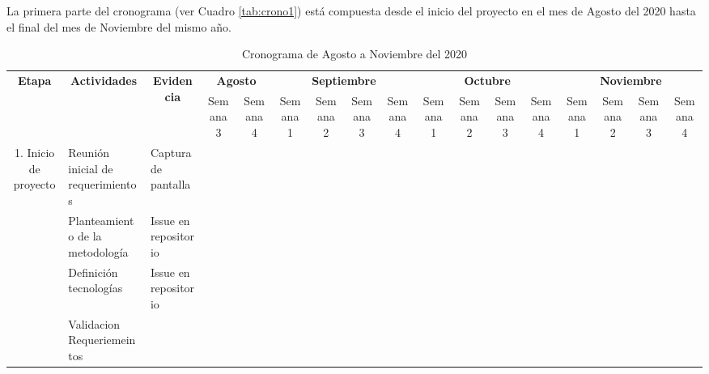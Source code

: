 La primera parte del cronograma (ver Cuadro \ref{tab:crono1}) está compuesta desde el inicio del proyecto en el mes de Agosto del 2020 hasta el final del mes de Noviembre del mismo año.

\begin{table}[H]
    \centering
    \caption{Cronograma de Agosto a Noviembre del 2020}
    \begin{adjustbox}{width={\textwidth},totalheight={\textheight},keepaspectratio}%
    \begin{tabular}{cp{10.555em}p{10.555em}rrrrrrrrrrrrrr}
    \hline
    \multirow{2}[4]{*}{\textbf{Etapa}} & \multicolumn{1}{c}{\multirow{2}[4]{*}{\textbf{Actividades}}} & \multicolumn{1}{c}{\multirow{2}[4]{*}{\textbf{Evidencia}}} & \multicolumn{2}{c}{\textbf{Agosto}} & \multicolumn{4}{c}{\textbf{Septiembre}} & \multicolumn{4}{c}{\textbf{Octubre}} & \multicolumn{4}{c}{\textbf{Noviembre}} \bigstrut\\
    \cline{4-17}  & \multicolumn{1}{c}{} & \multicolumn{1}{c}{} & \multicolumn{1}{c}{Semana 3} & \multicolumn{1}{c}{Semana 4} & \multicolumn{1}{c}{Semana 1} & \multicolumn{1}{c}{Semana 2} & \multicolumn{1}{c}{Semana 3} & \multicolumn{1}{c}{Semana 4} & \multicolumn{1}{c}{Semana 1} & \multicolumn{1}{c}{Semana 2} & \multicolumn{1}{c}{Semana 3} & \multicolumn{1}{c}{Semana 4} & \multicolumn{1}{c}{Semana 1} & \multicolumn{1}{c}{Semana 2} & \multicolumn{1}{c}{Semana 3} & \multicolumn{1}{c}{Semana 4} \bigstrut\\
    \cline{1-3}\multicolumn{1}{c}{\multirow{5}[10]{*}{1. Inicio de proyecto}} & Reunión inicial de requerimientos & Captura de pantalla & \cellcolor[rgb]{ .557,  .663,  .859} &   &   &   &   &   &   &   &   &   &   &   &   &  \bigstrut\\
    \cline{2-3}  & Planteamiento de la metodología & Issue en repositorio & \cellcolor[rgb]{ .851,  .882,  .949} & \cellcolor[rgb]{ .851,  .882,  .949} & \cellcolor[rgb]{ .851,  .882,  .949} &   &   &   &   &   &   &   &   &   &   &  \bigstrut\\
    \cline{2-3}  & Definición tecnologías & Issue en repositorio & \cellcolor[rgb]{ .557,  .663,  .859} & \cellcolor[rgb]{ .557,  .663,  .859} & \cellcolor[rgb]{ .557,  .663,  .859} &   &   &   &   &   &   &   &   &   &   &  \bigstrut\\
    \cline{2-3}  & Validacion Requeriemeintos & \multicolumn{1}{r}{} &   & \cellcolor[rgb]{ .851,  .882,  .949} &   & \cellcolor[rgb]{ .851,  .882,  .949} &   & \cellcolor[rgb]{ .851,  .882,  .949} & \cellcolor[rgb]{ .851,  .882,  .949} &   &   &   &   &   &   &  \bigstrut\\

\end{tabular}
\end{adjustbox}
\end{table}
